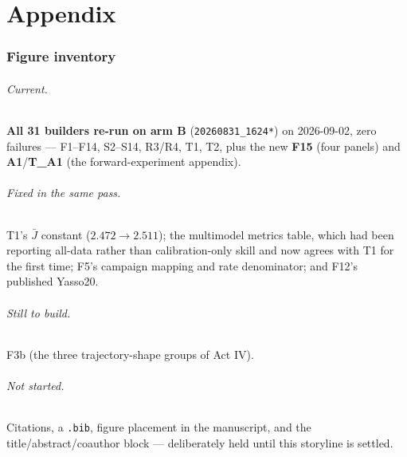 \documentclass[11pt]{article}
\begin{document}
\part{Appendix}
\section{Figure inventory}
\paragraph{Current.} \textbf{All 31 builders re-run on arm B} (\texttt{20260831\_1624*}) on
2026-09-02, zero failures --- F1--F14, S2--S14, R3/R4, T1, T2, plus the new \textbf{F15}
(four panels) and \textbf{A1}/\textbf{T\_A1} (the forward-experiment appendix).
\paragraph{Fixed in the same pass.} T1's $\bar J$ constant ($2.472 \to 2.511$); the multimodel
metrics table, which had been reporting all-data rather than calibration-only skill and now agrees
with T1 for the first time; F5's campaign mapping and rate denominator; and F12's published Yasso20.
\paragraph{Still to build.} F3b (the three trajectory-shape groups of Act IV).
\paragraph{Not started.} Citations, a \texttt{.bib}, figure placement in the manuscript, and the
title/abstract/coauthor block --- deliberately held until this storyline is settled.
\end{document}
